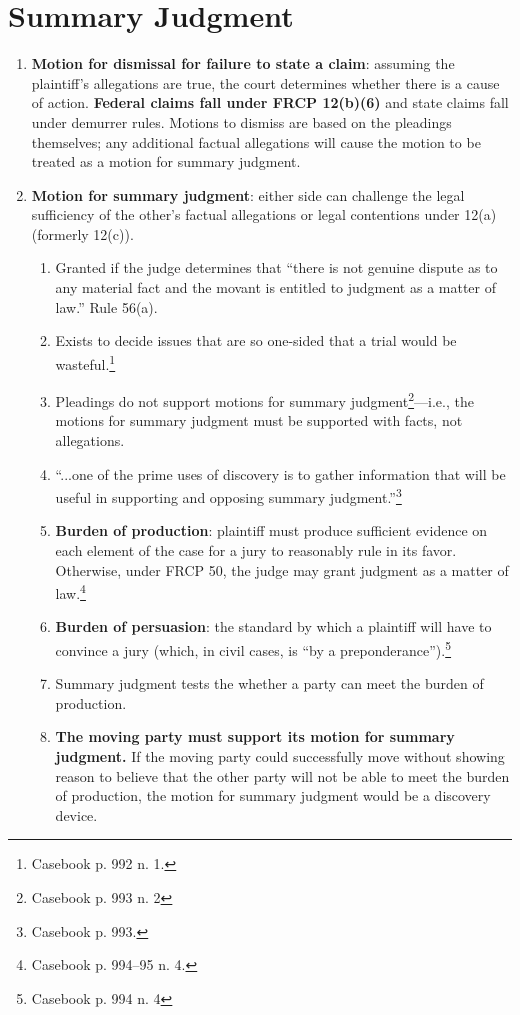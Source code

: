 \section{Summary Judgment}

\begin{enumerate}
    \item \textbf{Motion for dismissal for failure to state a claim}: assuming 
    the plaintiff's allegations are true, the court determines whether there 
    is a cause of action. \textbf{Federal claims fall under FRCP 12(b)(6)} and 
    state claims fall under demurrer rules. Motions to dismiss are based on 
    the pleadings themselves; any additional factual allegations will cause 
    the motion to be treated as a motion for summary judgment.
    \item \textbf{Motion for summary judgment}: either side can challenge the 
    legal sufficiency of the other's factual allegations or legal contentions 
    under 12(a) (formerly 12(c)).
    \begin{enumerate}
        \item Granted if the judge determines that ``there is not genuine 
        dispute as to any material fact and the movant is entitled to judgment 
        as a matter of law.'' Rule 56(a).
        \item Exists to decide issues that are so one-sided that a trial would 
        be wasteful.\footnote{Casebook p. 992 n. 1.}
        \item Pleadings do not support motions for summary 
        judgment\footnote{Casebook p. 993 n. 2}---i.e., the motions for 
        summary judgment must be supported with facts, not allegations.
        \item ``...one of the prime uses of discovery is to gather information 
        that will be useful in supporting and opposing summary 
        judgment.''\footnote{Casebook p. 993.}
        \item \textbf{Burden of production}: plaintiff must produce sufficient 
        evidence on each element of the case for a jury to reasonably rule in 
        its favor. Otherwise, under FRCP 50, the judge may grant judgment as a 
        matter of law.\footnote{Casebook p. 994--95 n. 4.}
        \item \textbf{Burden of persuasion}: the standard by which a plaintiff 
        will have to convince a jury (which, in civil cases, is ``by a 
        preponderance'').\footnote{Casebook p. 994 n. 4}
        \item Summary judgment tests the whether a party can meet the burden 
        of production.
        \item \textbf{The moving party must support its motion for summary 
        judgment.} If the moving party could successfully move without showing 
        reason to believe that the other party will not be able to meet the 
        burden of production, the motion for summary judgment would be a 
        discovery device.
    \end{enumerate}
\end{enumerate}

